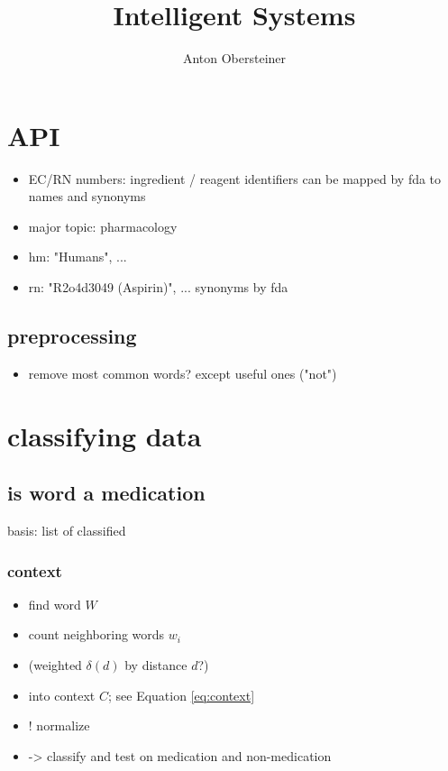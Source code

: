\documentclass{article}
\title{Intelligent Systems}
\author{Anton Obersteiner}
\begin{document}
\maketitle
\tableofcontents

\section{API}
\begin{itemize}
	\item EC/RN numbers: ingredient / reagent identifiers
		can be mapped by fda to names and synonyms
	\item major topic: pharmacology
	\item hm: "Humans", ...
	\item rn: "R2o4d3049 (Aspirin)", ...
		synonyms by fda
\end{itemize}

\subsection{preprocessing}
\begin{itemize}
	\item remove most common words? except useful ones ("not")
\end{itemize}


\section{classifying data}
\subsection{is word a medication}
basis: list of classified

\subsubsection{context}
\begin{itemize}
	\item find word $W$
	\item count neighboring words $w_i$
	\item (weighted $\delta(d)$ by distance $d$?)
	\item into context $C$; see Equation \ref{eq:context}
	\item ! normalize
	\item -> classify and test on medication and non-medication
\end{itemize}
\end{document}
